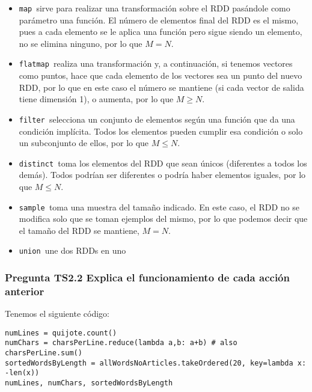 \documentclass[11pt]{article}
\def\inline{\lstinline[basicstyle=\ttfamily,keywordstyle={}]}
\begin{document}
\begin{itemize}

\item  \inline{map }sirve para realizar una transformación sobre el RDD pasándole como parámetro una función. El número de elementos final del RDD es el mismo, pues a cada elemento se le aplica una función pero sigue siendo un elemento, no se elimina ninguno, por lo que $M=N$.

\item  \inline{flatmap }realiza una transformación y, a continuación, si tenemos vectores como puntos, hace que cada elemento de los vectores sea un punto del nuevo RDD, por lo que en este caso el número se mantiene (si cada vector de salida tiene dimensión 1), o aumenta, por lo que $M \geq N$.

\item  \inline{filter }selecciona un conjunto de elementos según una función que da una condición implícita. Todos los elementos pueden cumplir esa condición o solo un subconjunto de ellos, por lo que $M \leq N$.

\item  \inline{distinct }toma los elementos del RDD que sean únicos (diferentes a todos los demás). Todos podrían ser diferentes o podría haber elementos iguales, por lo que $M \leq N$.

\item  \inline{sample }toma una muestra del tamaño indicado. En este caso, el RDD no se modifica solo que se toman ejemplos del mismo, por lo que podemos decir que el tamaño del RDD se mantiene, $M=N$.

\item  \inline{union }une dos RDDs en uno

\end{itemize}

\subsubsection*{ Pregunta TS2.2 Explica el funcionamiento de cada acción anterior }

Tenemos el siguiente código:
\begin{verbatim}
numLines = quijote.count()
numChars = charsPerLine.reduce(lambda a,b: a+b) # also charsPerLine.sum()
sortedWordsByLength = allWordsNoArticles.takeOrdered(20, key=lambda x: -len(x))
numLines, numChars, sortedWordsByLength
\end{verbatim}
\end{document}
